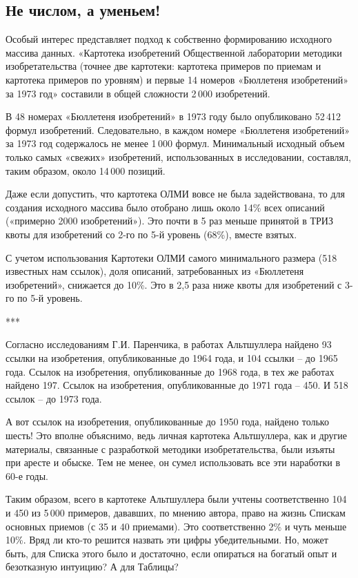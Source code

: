 \documentclass[11pt,a4paper]{article}
\begin{document}
\subsection*{Не числом, а уменьем!}

Особый интерес представляет подход к собственно формированию исходного массива
данных. «Картотека изобретений Общественной лаборатории методики
изобретательства (точнее две картотеки: картотека примеров по приемам и
картотека примеров по уровням) и первые 14 номеров «Бюллетеня изобретений» за
1973 год» составили в общей сложности 2\,000 изобретений.

В 48 номерах «Бюллетеня изобретений» в 1973 году было опубликовано 52\,412
формул изобретений. Следовательно, в каждом номере «Бюллетеня изобретений» за
1973 год содержалось не менее 1\,000 формул. Минимальный исходный объем только
самых «свежих» изобретений, использованных в исследовании, составлял, таким
образом, около 14\,000 позиций.

Даже если допустить, что картотека ОЛМИ вовсе не была задействована, то для
создания исходного массива было отобрано лишь около 14\% всех описаний
(«примерно 2000 изобретений»). Это почти в 5 раз меньше принятой в ТРИЗ квоты
для изобретений со 2-го по 5-й уровень (68\%), вместе взятых.

С учетом использования Картотеки ОЛМИ самого минимального размера (518
известных нам ссылок), доля описаний, затребованных из «Бюллетеня
изобретений», снижается до 10\%. Это в 2{,}5 раза ниже квоты для изобретений с
3-го по 5-й уровень.

\begin{center}
  ***
\end{center}

Согласно исследованиям Г.И. Паренчика, в работах Альтшуллера найдено 93 ссылки
на изобретения, опубликованные до 1964 года, и 104 ссылки -- до 1965 года.
Ссылок на изобретения, опубликованные до 1968 года, в тех же работах найдено
197.  Ссылок на изобретения, опубликованные до 1971 года -- 450. И 518 ссылок
-- до 1973 года. \cite{Parenchik2004}

А вот ссылок на изобретения, опубликованные до 1950 года, найдено только
шесть! Это вполне объяснимо, ведь личная картотека Альтшуллера, как и другие
материалы, связанные с разработкой методики изобретательства, были изъяты при
аресте и обыске. Тем не менее, он сумел использовать все эти наработки в 60-е
годы.

Таким образом, всего в картотеке Альтшуллера были учтены соответственно 104 и
450 из 5\,000 примеров, дававших, по мнению автора, право на жизнь Спискам
основных приемов (с 35 и 40 приемами). Это соответственно 2\% и чуть меньше
10\%. Вряд ли кто-то решится назвать эти цифры убедительными. Но, может быть,
для Списка этого было и достаточно, если опираться на богатый опыт и
безотказную интуицию? А для Таблицы?
\end{document}
